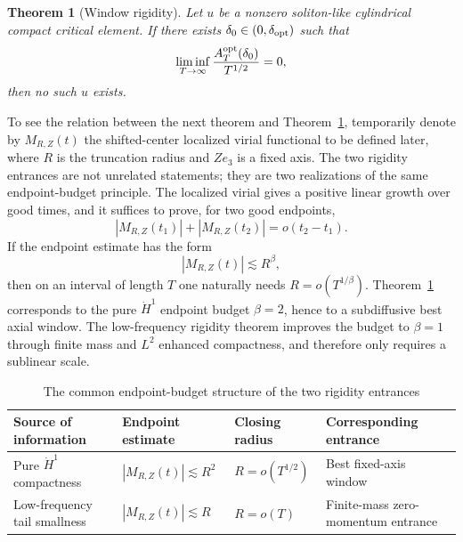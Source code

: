 \documentclass[preprint,12pt]{elsarticle}
\numberwithin{equation}{section}
\newcommand{\ez}{e_3}
\newcommand{\Aopt}{A^{\rm opt}}
\newtheorem{theorem}{Theorem}[section]
\theoremstyle{remark}
\begin{document}
\begin{theorem}[Window rigidity]\label{thm:window-rigidity}
Let $u$ be a nonzero soliton-like cylindrical compact critical element.  If there exists $\delta_0\in(0,\delta_{\rm opt})$ such that
\begin{equation}\label{eq:Aopt-subdiff-main}
  \liminf_{T\to\infty}\frac{\Aopt_T(\delta_0)}{T^{1/2}}=0,
\end{equation}
then no such $u$ exists.
\end{theorem}

To see the relation between the next theorem and Theorem~\ref{thm:window-rigidity}, temporarily denote by $M_{R,Z}(t)$ the shifted-center localized virial functional to be defined later, where $R$ is the truncation radius and $Z\ez$ is a fixed axis.  The two rigidity entrances are not unrelated statements; they are two realizations of the same endpoint-budget principle.  The localized virial gives a positive linear growth over good times, and it suffices to prove, for two good endpoints,
\[
  |M_{R,Z}(t_1)|+|M_{R,Z}(t_2)|=o(t_2-t_1).
\]
If the endpoint estimate has the form
\[
  |M_{R,Z}(t)|\lesssim R^\beta,
\]
then on an interval of length $T$ one naturally needs $R=o(T^{1/\beta})$.  Theorem~\ref{thm:window-rigidity} corresponds to the pure $\dot H^1$ endpoint budget $\beta=2$, hence to a subdiffusive best axial window.  The low-frequency rigidity theorem improves the budget to $\beta=1$ through finite mass and $L^2$ enhanced compactness, and therefore only requires a sublinear scale.

\begin{table}[H]
\centering
\small
\caption{The common endpoint-budget structure of the two rigidity entrances}
\label{tab:intro-endpoint-budget}
\begin{tabular}{p{}p{}p{}p{}}
\hline
Source of information & Endpoint estimate & Closing radius & Corresponding entrance \\ \hline
Pure $\dot H^1$ compactness & $|M_{R,Z}(t)|\lesssim R^2$ & $R=o(T^{1/2})$ & Best fixed-axis window \\
Low-frequency tail smallness & $|M_{R,Z}(t)|\lesssim R$ & $R=o(T)$ & Finite-mass zero-momentum entrance \\ \hline
\end{tabular}
\end{table}
\end{document}

